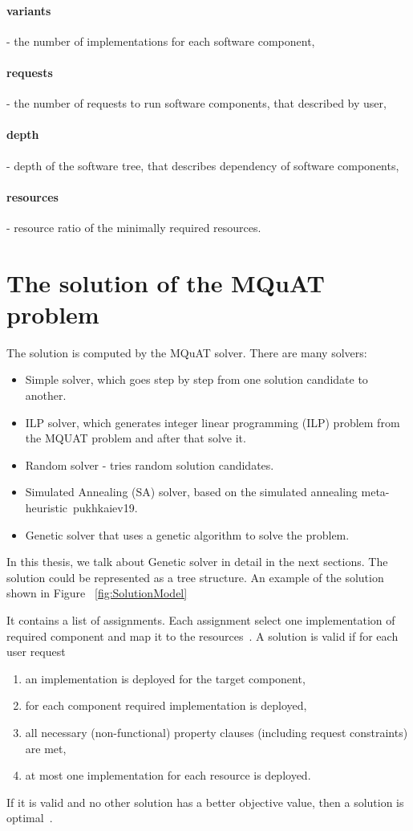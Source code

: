 \paragraph{variants} - the number of implementations for each software component,
\paragraph{requests} - the number of requests to run software components, that described by user, 
\paragraph{depth} - depth of the software tree, that describes dependency of software components,
\paragraph{resources} - resource ratio of the minimally required resources.

\section{The solution of the MQuAT problem}
The solution is computed by the MQuAT solver. There are many solvers:
\begin{itemize}
	\item Simple solver, which goes step by step from one solution candidate to another.
	\item ILP solver, which generates integer linear programming (ILP) problem from the MQUAT problem and after that solve it.
	\item Random solver - tries random solution candidates.
	\item Simulated Annealing (SA) solver, based on the simulated annealing meta-heuristic~{pukhkaiev19}.
	\item Genetic solver that uses a genetic algorithm to solve the problem.
\end{itemize}
In this thesis, we talk about Genetic solver in detail in the next sections.
The solution could be represented as a tree structure. An example of the solution shown in Figure ~\ref{fig:SolutionModel}

It contains a list of assignments. Each assignment select one implementation of required component and map it to the resources~\cite{gotz18}.
A solution is valid if for each user request
\begin{enumerate}
	\item an implementation is deployed for the target component,
	\item for each component required implementation is deployed,
	\item all necessary (non-functional) property clauses (including request constraints) are met,
	\item at most one implementation for each resource is deployed.
\end{enumerate}
If it is valid and no other solution has a better objective value, then a solution is optimal~\cite{gotz18}.

